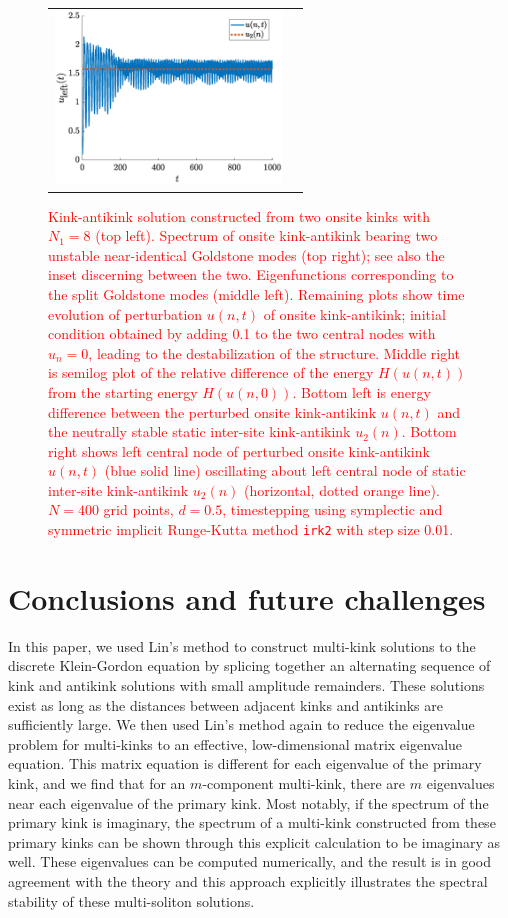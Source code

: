 \documentclass[12pt,reqno]{amsart}
\newcommand{\revised}[1]{ \textcolor{red}{#1} }
\begin{document}
\begin{figure}
\begin{center}
\begin{tabular}{cc}
	\includegraphics[width=6cm]{kakuleft.eps}
	\end{tabular}
	\end{center}
	\caption{ \revised{Kink-antikink solution constructed from two onsite kinks with $N_1 = 8$ (top left). Spectrum of onsite kink-antikink bearing two unstable near-identical Goldstone modes (top right); see also the inset discerning between the two. Eigenfunctions corresponding to the split Goldstone modes (middle left). Remaining plots show time evolution of perturbation $u(n,t)$ of onsite kink-antikink; initial condition obtained by adding 0.1 to the two central nodes with $u_n = 0$, leading to the destabilization of the structure. Middle right is semilog plot of the relative difference of the energy $H(u(n, t))$ from the starting energy $H(u(n, 0))$. Bottom left is energy difference between the perturbed onsite kink-antikink $u(n,t)$ and the neutrally stable static inter-site kink-antikink $u_2(n)$. Bottom right shows left central node of perturbed onsite kink-antikink $u(n,t)$ (blue solid line) oscillating about left central node of static inter-site kink-antikink $u_2(n)$ (horizontal, dotted orange line). $N=400$ grid points, $d = 0.5$, timestepping using symplectic and symmetric implicit Runge-Kutta method \texttt{irk2} with step size 0.01. }} 
	\label{fig:unstablekak}
\end{figure}

\section{Conclusions and future challenges}\label{sec:conclusions}

In this paper, we used Lin's method to construct multi-kink solutions to the discrete Klein-Gordon equation by splicing together an alternating sequence of kink and antikink solutions with small amplitude remainders. These solutions exist as long as the distances between adjacent kinks and antikinks are sufficiently large. We then used Lin's method again to reduce the eigenvalue problem for multi-kinks to an effective, low-dimensional matrix 
eigenvalue equation. This matrix equation is different for each eigenvalue of the primary kink, and we find that for an $m$-component multi-kink, there are $m$ eigenvalues near each eigenvalue of the primary kink. Most notably, if the spectrum of the primary kink is imaginary, the spectrum of a multi-kink constructed from these primary kinks can be shown through this
explicit calculation to be imaginary as well. These eigenvalues can be computed numerically, and the result is in good agreement with the theory and this approach explicitly illustrates the 
spectral stability of these multi-soliton solutions.
\end{document}
